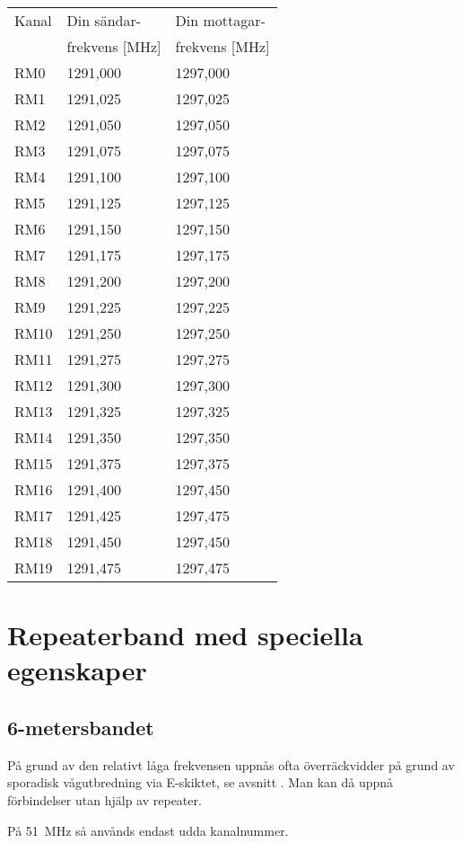 \begin{tabular}{ l | l | l }
	Kanal & Din sändar- & Din mottagar- \\
	& frekvens [\si{\mega\hertz}] & frekvens [\si{\mega\hertz}] \\
	\hline
	RM0 & 1291,000 & 1297,000 \\
	RM1 & 1291,025 & 1297,025 \\
	RM2 & 1291,050 & 1297,050 \\
	RM3 & 1291,075 & 1297,075 \\
	RM4 & 1291,100 & 1297,100 \\
	RM5 & 1291,125 & 1297,125 \\
	RM6 & 1291,150 & 1297,150 \\
	RM7 & 1291,175 & 1297,175 \\
	RM8 & 1291,200 & 1297,200 \\
	RM9 & 1291,225 & 1297,225 \\
	RM10 & 1291,250 & 1297,250 \\
	RM11 & 1291,275 & 1297,275 \\
	RM12 & 1291,300 & 1297,300 \\
	RM13 & 1291,325 & 1297,325 \\
	RM14 & 1291,350 & 1297,350 \\
	RM15 & 1291,375 & 1297,375 \\
	RM16 & 1291,400 & 1297,450 \\
	RM17 & 1291,425 & 1297,475 \\
	RM18 & 1291,450 & 1297,450 \\
	RM19 & 1291,475 & 1297,475 \\
\end{tabular}

\newpage

\section[Speciella band]{Repeaterband med speciella egenskaper}
\subsection{6-metersbandet}

På grund av den relativt låga frekvensen uppnås ofta överräckvidder på grund av
sporadisk vågutbredning via E-skiktet, se avsnitt .
Man kan då uppnå förbindelser utan hjälp av repeater.

På \SI{51}{\mega\hertz} så anvånds endast udda kanalnummer.

